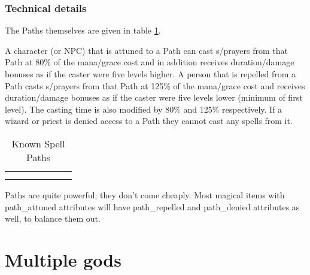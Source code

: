 {{\subsubsection{Technical details}

The Paths themselves are given in table \ref{tab:spath}.

A character (or NPC) that is attuned to a Path can cast \incantation s/prayers from that
Path at 80\% of the mana/grace cost and in addition receives duration/damage
bonuses as if the caster were five levels higher. A person that is repelled
from a Path casts \incantation s/prayers from that Path
at 125\% of the mana/grace cost and receives duration/damage bonuses as if
the caster were five levels lower (minimum of first level).
The casting time is also modified by 80\% and 125\% respectively.
If a wizard or priest is denied access to a Path they cannot cast any spells from it.

\begin{table}
\begin{center}
\caption{Known Spell Paths \label{tab:spath}}
\small
\vskip 12pt
\begin{tabular}{|clllllc|} \hline
& & & & & & \\

& & & & & & \\
\hline
\end{tabular}
\end{center}
\end{table}

Paths are quite powerful; they don't come cheaply. Most magical items
with path\_attuned attributes will have path\_repelled and path\_denied
attributes as well, to balance them out.

\section{Multiple gods} \label{sec:multigod}
}}
